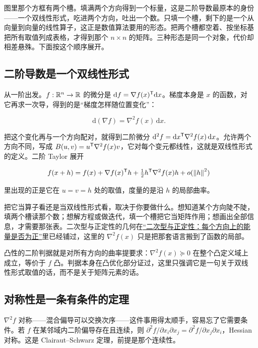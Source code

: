 图里那个方框有两个槽。填满两个方向得到一个标量，这是二阶导数最原本的身份——一个双线性形式，吃进两个方向，吐出一个数。只填一个槽，剩下的是一个从向量到向量的线性算子，这正是数值算法要用的形态。把两个槽都空着、按坐标基把所有取值列成表格，才得到那个 \(n\times n\) 的矩阵。三种形态是同一个对象，代价却相差悬殊。下面按这个顺序展开。

\subsection{二阶导数是一个双线性形式}

从一阶出发。\(f:\mathbb{R}^n\to\mathbb{R}\) 的微分是 \(\mathrm df=\nabla f(x)^{\mathsf{T}}\mathrm dx\)。梯度本身是 \(x\) 的函数，对它再求一次导，得到的是``梯度怎样随位置变化''：

\[
\mathrm d(\nabla f)=\nabla^2f(x)\,\mathrm dx.
\]

把这个变化再与一个方向配对，就得到二阶微分 \(\mathrm d^2f=\mathrm dx^{\mathsf{T}}\nabla^2f(x)\,\mathrm dx\)。允许两个方向不同，写成 \(B(u,v)=u^{\mathsf{T}}\nabla^2f(x)v\)，它对每个变元都线性，这就是双线性形式的定义。二阶 Taylor 展开

\[
f(x+h)=f(x)+\nabla f(x)^{\mathsf{T}}h+\tfrac12h^{\mathsf{T}}\nabla^2f(x)h+o(\left\lVert h\right\rVert^2)
\]

里出现的正是它在 \(u=v=h\) 处的取值，度量的是沿 \(h\) 的局部曲率。

把它当算子看还是当双线性形式看，取决于你要做什么。想知道某个方向陡不陡，填两个槽读那个数；想解方程或做迭代，填一个槽把它当矩阵作用；想画出全部信息，才需要那张表。二次型与正定性的几何在\hyperref[sec:03-Linear-Algebra/06-Symmetric-and-Positive-Definite-Matrices/02]{``二次型与正定性：每个方向上的能量是否为正''}里已经铺过，这里的 \(\nabla^2f(x)\) 只是把那套语言搬到了函数的局部。

凸性的二阶判据就是对所有方向的曲率提要求：\(\nabla^2f(x)\succeq0\) 在整个凸定义域上成立，等价于 \(f\) 凸。判据本身在凸优化部分证过，这里只强调它是一句关于双线性形式取值的话，而不是关于矩阵元素的话。

\subsection{对称性是一条有条件的定理}

\(\nabla^2f\) 对称——混合偏导可以交换次序——这件事用得太顺手，容易忘了它需要条件。若 \(f\) 在某邻域内二阶偏导存在且连续，则 \(\partial^2f/\partial x_i\partial x_j=\partial^2f/\partial x_j\partial x_i\)，Hessian 对称。这是 Clairaut--Schwarz 定理，前提是那个连续性。

